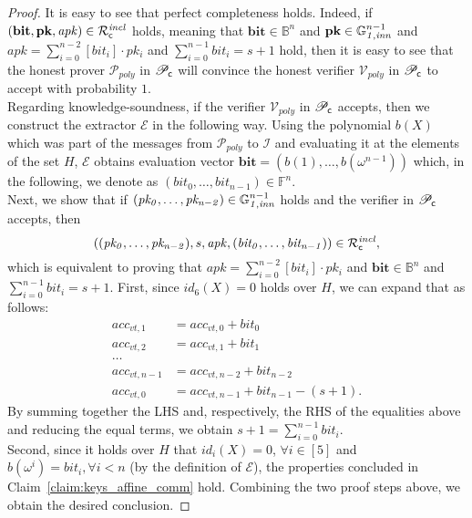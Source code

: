 \begin{proof}
It is easy to see that perfect completeness holds. Indeed, if $(\mathbf{bit},\mathbf{pk}, \mathit{apk}) \in \mathcal{R}^{\mathit{incl}}_{\mathsf{c}}$ holds, 
meaning that $\mathbf{bit} \in \mathbb{B}^n$ and $\mathbf{pk} \in \mathbb{G}_{\mathit{1,inn}}^{n-1}$ and $\mathit{apk} = \sum_{i=0}^{n-2} [\mathit{bit_i}] \cdot \mathit{pk_i}$ and 
$\sum_{i=0}^{n-1} \mathit{bit_i} = s+1$ hold, then it is easy to see that the honest prover $\mathcal{P}_{poly}$ in $\mathscr{P}_{\mathsf{c}}$ will convince the honest 
verifier $\mathcal{V}_{poly}$ in $\mathscr{P}_{\mathsf{c}}$ to accept with probability $1$. \\
Regarding knowledge-soundness, if the verifier $\mathcal{V}_{poly}$ in $\mathscr{P}_{\mathsf{c}}$ accepts, 
then we construct the extractor $\mathcal{E}$ in the following way. Using the polynomial $b(X)$ which 
was part of the messages from $\mathcal{P}_{poly}$ to $\mathcal{I}$ and evaluating it at the elements of the set 
$H$, $\mathcal{E}$ obtains evaluation vector $\mathbf{bit} = (b(1), \ldots, b(\omega^{n-1}))$ which, 
in the following, we denote as $(\mathit{bit}_0, \ldots, \mathit{bit}_{n-1}) \in \mathbb{F}^n$.\\ 
\noindent Next, we show that if $(\mathit{pk_0}, \ldots, \mathit{pk_{n-2}}) \in \mathbb{G}_{\mathit{1,inn}}^{n-1}$ holds and the 
verifier in $\mathscr{P}_{\mathsf{c}}$ accepts, then 
$$((\mathit{pk_0}, \ldots, \mathit{pk_{n-2}}), s, \mathit{apk}, (\mathit{bit_0}, \ldots, \mathit{bit_{n-1}})) \in \mathcal{R}^{\mathit{incl}}_{\mathsf{c}},$$ 
which is equivalent to proving that $\mathit{apk} = \sum_{i=0}^{n-2} [\mathit{bit_i}]  \cdot \mathit{pk_i}$ and 
$\mathbf{bit} \in \mathbb{B}^n$ and  $\sum_{i=0}^{n-1} \mathit{bit_i} = s+1$.
\noindent First, since $id_6(X) = 0$ holds over $H$, we can expand that as follows:
\begin{align*}
acc_{vt,1} &= acc_{vt,0} + \mathit{bit}_{0} \\
acc_{vt, 2} &= acc_{vt,1} + \mathit{bit}_{1} \\
\ldots \\
acc_{vt,n-1} &= acc_{vt,n-2} + \mathit{bit}_{n-2} \\
acc_{vt,0} &= acc_{vt,n-1} + \mathit{bit}_{n-1} - (s+1).
\end{align*}
\noindent By summing together the LHS and, respectively, the RHS of the equalities above and 
reducing the equal terms, we obtain $s+1 = \sum_{i=0}^{n-1}\mathit{bit}_i$. \\ 
Second, since it holds over $H$ that $id_i(X) = 0$, $\forall i \in [5]$ and $b(\omega^i) = \mathit{bit_i}, \forall i<n$ (by the definition 
of $\mathcal{E}$), the properties concluded in Claim~\ref{claim:keys_affine_comm} hold. Combining the two proof steps above, we obtain the desired conclusion.
\end{proof}


